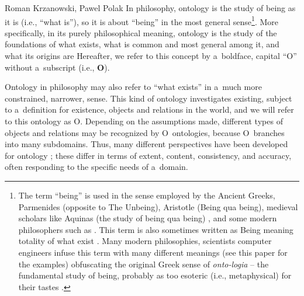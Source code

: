 \begin{artengenv2auth}{Roman Krzanowski, Pawel Polak}
In philosophy, ontology is the study of being as it is (i.e., ``what is''), so it is about ``being'' in the most general sense\footnote{The term ``being'' is used in the sense employed by the Ancient Greeks, Parmenides (opposite to The Unbeing), Aristotle (Being qua being), medieval scholars like Aquinas (the study of being qua being)
\parencite[][]{kerr_aquinas_2022}, %
 and some modern philosophers such as 
\parencites[][]{jacquette_ontology_2002}[][]{strozewski_ontologia_2004}[or][]{perzanowski_rozprawa_2015}. %
 This term is also sometimes written as Being meaning totality of what exist 
\parencite[][p.160]{kenny_new_2012}. %
 Many modern philosophies, scientists computer engineers infuse this term with many different meanings (see this paper for the examples) obfuscating the original Greek sense of \textit{onto-logia} -- the fundamental study of being, probably as too esoteric (i.e., metaphysical) for their tastes 
\parencites[see also][]{kenny_new_2012}[][]{hofweber_logic_2021}.%
}. More specifically, in its purely philosophical meaning, ontology is the study of the foundations of what exists, what is common and most general among it, and what its origins are 
\parencites[see, e.g.,][]{jacquette_ontology_2002}[][p.32]{strozewski_ontologia_2004} %
 Hereafter, we refer to this concept by a~boldface, capital ``O'' without a~subscript (i.e., \textbf{O}).

Ontology in philosophy may also refer to ``what exists'' in a~much more constrained, narrower, sense. This kind of ontology investigates existing, subject to a~definition for existence, objects and relations in the world, and we will refer to this ontology as O. Depending on the assumptions made, different types of objects and relations may be recognized by O~ontologies, because O~branches into many subdomains. Thus, many different perspectives have been developed for ontology
\parencites[e.g.,][]{quine_word_1960}[][]{jacquette_ontology_2002}[][]{strozewski_ontologia_2004}[][]{baker_metaphysics_2007}[][]{chalmers_metametaphysics_2009}[][]{effingham_introduction_2013}[][]{ingarden_controversy_2013}[][]{ingarden_controversy_2016}[][]{berto_ontology_2015}[][]{perzanowski_rozprawa_2015}[][]{thomasson_ontology_2015}[][]{hofweber_logic_2021}; %
 these differ in terms of extent, content, consistency, and accuracy, often responding to the specific needs of a~domain.


\end{artengenv2auth}
